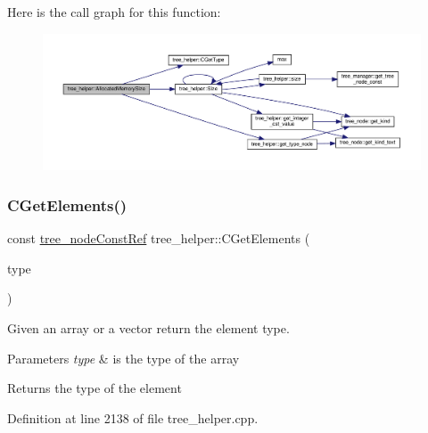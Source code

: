 Here is the call graph for this function\+:
\nopagebreak
\begin{figure}[H]
\begin{center}
\leavevmode
\includegraphics[width=350pt]{d7/d99/classtree__helper_a55c8ae98513afb49111c0990c05c7764_cgraph}
\end{center}
\end{figure}
\mbox{\label{classtree__helper_a9119915404743215b4f3a6bb15718375}} 
\subsubsection{\texorpdfstring{C\+Get\+Elements()}{CGetElements()}}
{\footnotesize\ttfamily const \hyperlink{tree__node_8hpp_a3cf5d02292c940f3892425a5b5fdec3c}{tree\+\_\+node\+Const\+Ref} tree\+\_\+helper\+::\+C\+Get\+Elements (\begin{DoxyParamCaption}\item[{const \hyperlink{tree__node_8hpp_a3cf5d02292c940f3892425a5b5fdec3c}{tree\+\_\+node\+Const\+Ref}}]{type }\end{DoxyParamCaption})\hspace{0.3cm}{\ttfamily [static]}}



Given an array or a vector return the element type. 


\begin{DoxyParams}{Parameters}
{\em type} & is the type of the array \\
\hline
\end{DoxyParams}
\begin{DoxyReturn}{Returns}
the type of the element 
\end{DoxyReturn}


Definition at line 2138 of file tree\+\_\+helper.\+cpp.



